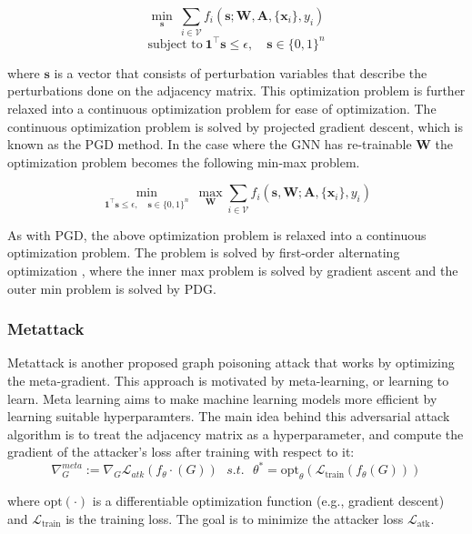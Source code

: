 \documentclass{article}
\begin{document}
\begin{equation}
    \min_{\mathbf{s}}\ \sum_{i \in \mathcal{V}} f_i(\mathbf{s}; \mathbf{W}, \mathbf{A}, \{\mathbf{x}_i\}, y_i)   
\end{equation}
\[
\text{subject to}\ \mathbf{1}^\top \mathbf{s} \leq \epsilon, \quad \mathbf{s} \in \{0, 1\}^{n}
\]

where $\mathbf{s}$ is a vector that consists of perturbation variables that describe the perturbations done on the adjacency matrix. This optimization problem is further relaxed into a continuous optimization problem for ease of optimization. The continuous optimization problem is solved by projected gradient descent, which is known as the PGD method. In the case where the GNN has re-trainable $\mathbf{W}$ the optimization problem becomes the following min-max problem. 

\begin{equation}
    \min_{\mathbf{1}^\top \mathbf{s} \leq \epsilon, \quad \mathbf{s} \in \{0, 1\}^{n}}\ 
    \max_{\mathbf{W}} \sum_{i \in \mathcal{V}} f_i(\mathbf{s}, \mathbf{W}; \mathbf{A}, \{\mathbf{x}_i\}, y_i)
\end{equation}

As with PGD, the above optimization problem is relaxed into a continuous optimization problem. The problem is solved by first-order alternating optimization \cite{minmaxopt}, where the inner max problem is solved by gradient ascent and the outer min problem is solved by PDG.

\subsubsection{Metattack}

Metattack \cite{zügner2024Metattack} is another proposed graph poisoning attack that works by optimizing the meta-gradient. This approach is motivated by meta-learning, or learning to learn. Meta learning aims to make machine learning models more efficient by learning suitable hyperparamters. The main idea behind this adversarial attack algorithm is to treat the adjacency matrix as a hyperparameter, and compute the gradient of the attacker's loss after training with respect to it:
\begin{equation}
    \nabla_{G}^{meta} := \nabla_{G}\mathcal{L}_{atk}(f_{\theta}\cdot(G))\ \ \ s.t. \ \ \
    \theta^{*} = \text{opt}_{\theta}(\mathcal{L}_{\text{train}}(f_{\theta}(G)))
\end{equation}

where $\text{opt}(\cdot)$ is a differentiable optimization function (e.g., gradient descent) and $\mathcal{L}_{\text{train}}$ is the training loss. The goal is to minimize the attacker loss $\mathcal{L}_{\text{atk}}$.
\end{document}
